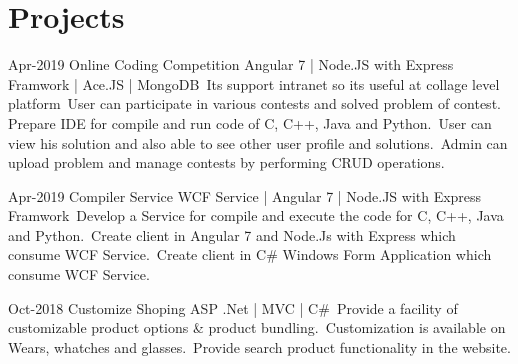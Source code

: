 \documentclass[print]{cv-style}          %
\begin{document}

\section{Projects}

\begin{entrylist}
\entry
{Apr-2019}
{Online Coding Competition }
{Angular 7 | Node.JS with Express Framwork | Ace.JS | MongoDB }
{\textbullet \,Its support intranet so its useful at collage level platform\newline 
\textbullet \,User can participate in various contests and solved problem of contest. \newline 
\textbullet\,Prepare IDE for compile and run code of  C, C++, Java and  Python.\newline
\textbullet\,User can view his solution and also able to see other user profile and solutions.\newline
\textbullet\,Admin can upload problem and manage contests by performing CRUD operations.}
{\vspace{-0.6cm}}
\end{entrylist}

\begin{entrylist}
\entry
{Apr-2019}
{Compiler Service }
{WCF Service | Angular 7 | Node.JS with Express Framwork }
{\textbullet\,Develop a Service for compile and execute the code for C, C++, Java and Python.\newline
\textbullet\,Create client in Angular 7 and Node.Js with Express which consume WCF Service. \newline
\textbullet\,Create client in C\# Windows Form Application  which consume WCF Service.}
{\vspace{-0.6cm}}
\end{entrylist}

\begin{entrylist}
\entry
{ Oct-2018 }
{Customize Shoping }
{ASP .Net | MVC | C\# }
{\textbullet\,Provide a facility of customizable product options \& product bundling. 
\newline\textbullet\,Customization is available on Wears, whatches and glasses.
\newline\textbullet\,Provide search product functionality in the website.
}
{\vspace{-0.6cm}}
\end{entrylist}
\end{document}
